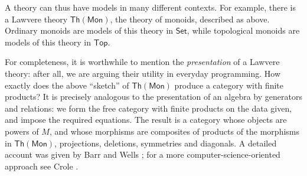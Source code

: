 \documentclass{amsart}
\theoremstyle{definition}
\newcommand{\Th}{\mathsf{Th}}
\newcommand{\Set}{\mathsf{Set}}
\newcommand{\Top}{\mathsf{Top}}
\newcommand{\Mon}{\mathsf{Mon}}
\newcommand{\T}{\mathsf{T}}
\begin{document}
A theory can thus have models in many different contexts.   For example, there is a Lawvere theory $\Th(\Mon)$, the theory of monoids, described as above.  Ordinary monoids are models of this theory in $\Set$, while topological monoids are models of this theory in $\Top$.

For completeness, it is worthwhile to mention the \textit{presentation} of a Lawvere theory: after all, we are arguing their utility in everyday programming.  How exactly does the above ``sketch'' of $\Th(\Mon)$ produce a category with finite products?  It is precisely analogous to the presentation of an algebra by generators and relations: we form the free category with finite products on the data given, and impose the required equations.  The result is a category whose objects are powers of $M$, and whose morphisms are composites of products of the morphisms in $\Th(\Mon)$, projections, deletions, symmetries and diagonals.  A detailed account was given by Barr and Wells \cite[Chap.\ 4]{barrwells}; for a more computer-science-oriented approach see Crole \cite[Chap.\ 3]{crole}.

\iffalse
\begin{center}
	\begin{minipage}{.2 \textwidth}
		\begin{prooftree}
			\Axiom$a \; ,\; b \fCenter \; :\T$
			\UnaryInf$a\times b \fCenter \; : \T$
		\end{prooftree}
	\end{minipage} \qquad
	\begin{minipage}{.2 \textwidth}
		\begin{prooftree}
			\Axiom$f \; :a\to b\; \fCenter ,\; g\; :c\to d$
			\UnaryInf$f\times g \; : \; a\;\times\fCenter \;b \; \to c\times d$
		\end{prooftree}
	\end{minipage} \qquad \qquad
	\begin{minipage}{.2 \textwidth}
		\begin{prooftree}
			\Axiom$h: d\to a\; ,\; \fCenter k:e\to b$
			\doubleLine
			\UnaryInf$\big\langle h,k \big\rangle :\; e \fCenter\;\to a\times b$
		\end{prooftree}
	\end{minipage}
\end{center}
\begin{center}
\begin{minipage}{.2 \textwidth}
	\begin{prooftree}
		\Axiom$a\times b \; \fCenter : \T$
		\UnaryInf$\pi_1 : a\times b\to a \; \fCenter \; ,\; \pi_2 : a\times b\to b$
	\end{prooftree}
\end{minipage} \qquad \qquad \qquad
\begin{minipage}{.2 \textwidth}
	\begin{prooftree}
		\Axiom$\big\langle h,k \big\rangle :\; e\; \fCenter\to a\times b$
		\UnaryInf$\pi_1 \big\langle h,k \big\rangle \equiv h \; \fCenter ,\; \pi_2 \big\langle h,k \big\rangle \equiv k$
	\end{prooftree}
\end{minipage}
\end{center}
\fi
\end{document}
